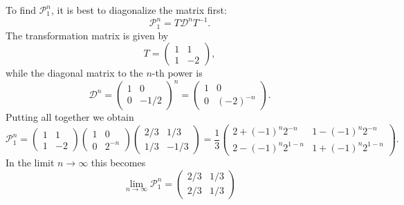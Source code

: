 To find $\mathcal{P}_1^{n}$, it is best to diagonalize the matrix first:
\begin{equation}
    \mathcal{P}_{1}^{n} = T \mathcal{D}^{n} T^{-1}.
\end{equation}
The transformation matrix is given by
\begin{equation}
    T =
    \begin{pmatrix}
        1 & 1 \\
        1 & -2
    \end{pmatrix},
\end{equation}
while the diagonal matrix to the $n$-th power is
\begin{equation}
    \mathcal{D}^{n} =
    \begin{pmatrix}
        1 & 0 \\
        0 & -1/2
    \end{pmatrix}^n
    =
    \begin{pmatrix}
        1 & 0 \\
        0 & (-2)^{-n}
    \end{pmatrix}.
\end{equation}
Putting all together we obtain
\begin{equation}
    \mathcal{P}_{1}^{n} =
    \begin{pmatrix}
        1 & 1 \\
        1 & -2
    \end{pmatrix}
    \begin{pmatrix}
        1 & 0 \\
        0 & 2^{-n}
    \end{pmatrix}
    \begin{pmatrix}
        2/3 & 1/3 \\
        1/3 & -1/3
    \end{pmatrix}
    =\frac{1}{3}
    \begin{pmatrix}
        2 + (-1)^{n} 2^{-n} & 1 - (-1)^{n} 2^{-n} \\
        2 - (-1)^{n} 2^{1-n} & 1 + (-1)^{n} 2^{1-n}
    \end{pmatrix}.
\end{equation}
In the limit $n\to \infty$ this becomes
\begin{equation}
    \lim_{n \to \infty} \mathcal{P}_{1}^{n} =
    \begin{pmatrix}
        2/3 & 1/3 \\
        2/3 & 1/3
    \end{pmatrix}
\end{equation}

